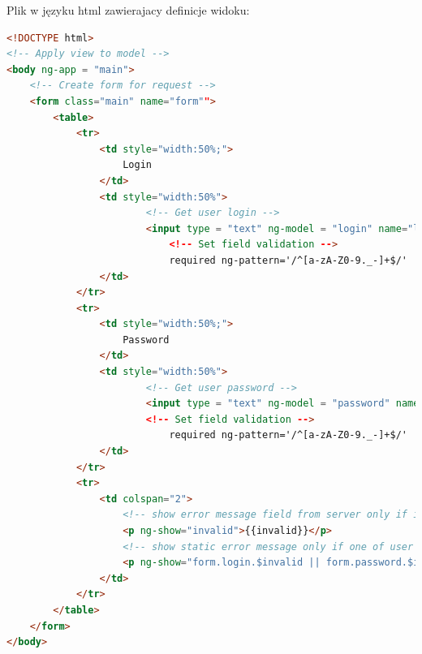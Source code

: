 \documentclass[12pt]{report}
\begin{document}
Plik w języku html zawierajacy definicje widoku:
\begin{lstlisting}[language=HTML]
<!DOCTYPE html> 
<!-- Apply view to model -->
<body ng-app = "main">
	<!-- Create form for request -->
	<form class="main" name="form""> 
		<table>
			<tr>
				<td style="width:50%;">
					Login
				</td>
				<td style="width:50%">
						<!-- Get user login -->
						<input type = "text" ng-model = "login" name="login"
							<!-- Set field validation -->
							required ng-pattern='/^[a-zA-Z0-9._-]+$/'  ng-maxlength="20" ng-minlength="3">
				</td>
			</tr>
			<tr>
				<td style="width:50%;">
					Password
				</td>
				<td style="width:50%">
						<!-- Get user password -->
						<input type = "text" ng-model = "password" name="password"
						<!-- Set field validation -->
							required ng-pattern='/^[a-zA-Z0-9._-]+$/'  ng-maxlength="20" ng-minlength="3">
				</td>
			</tr>
			<tr>
				<td colspan="2">
					<!-- show error message field from server only if invalid field exist -->
					<p ng-show="invalid">{{invalid}}</p>
					<!-- show static error message only if one of user field are invalid -->
					<p ng-show="form.login.$invalid || form.password.$invalid">Invalid login or password</p>
				</td>	
			</tr>
		</table>
	</form>
</body>
\end{lstlisting}
\end{document}
